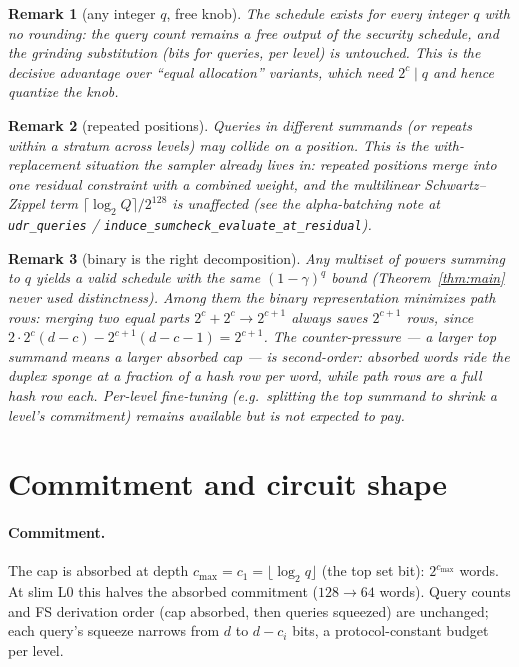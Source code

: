 \documentclass[11pt]{article}
\newcommand{\code}[1]{\texttt{#1}}
\newtheorem{remark}{Remark}
\theoremstyle{definition}
\begin{document}
\begin{remark}[any integer $q$, free knob]
The schedule exists for every integer $q$ with no rounding: the query
count remains a free output of the security schedule, and the grinding
substitution (bits for queries, per level) is untouched. This is the
decisive advantage over ``equal allocation'' variants, which need
$2^c \mid q$ and hence quantize the knob.
\end{remark}

\begin{remark}[repeated positions]
Queries in different summands (or repeats within a stratum across
levels) may collide on a position. This is the with-replacement
situation the sampler already lives in: repeated positions merge into
one residual constraint with a combined weight, and the multilinear
Schwartz--Zippel term $\lceil \log_2 Q \rceil / 2^{128}$ is unaffected
(see the alpha-batching note at \code{udr\_queries} /
\code{induce\_sumcheck\_evaluate\_at\_residual}).
\end{remark}

\begin{remark}[binary is the right decomposition]
Any multiset of powers summing to $q$ yields a valid schedule with the
same $(1-\gamma)^q$ bound (Theorem~\ref{thm:main} never used
distinctness). Among them the binary representation minimizes path
rows: merging two equal parts $2^c + 2^c \to 2^{c+1}$ always saves
$2^{c+1}$ rows, since $2 \cdot 2^{c}(d-c) - 2^{c+1}(d-c-1) =
2^{c+1}$. The counter-pressure --- a larger top summand means a larger
absorbed cap --- is second-order: absorbed words ride the duplex
sponge at a fraction of a hash row per word, while path rows are a
full hash row each. Per-level fine-tuning (e.g.\ splitting the top
summand to shrink a level's commitment) remains available but is not
expected to pay.
\end{remark}

\section{Commitment and circuit shape}

\paragraph{Commitment.}
The cap is absorbed at depth $c_{\max} = c_1 = \lfloor \log_2 q
\rfloor$ (the top set bit): $2^{c_{\max}}$ words. At slim L0 this
halves the absorbed commitment ($128 \to 64$ words). Query counts and
FS derivation order (cap absorbed, then queries squeezed) are
unchanged; each query's squeeze narrows from $d$ to $d - c_i$ bits,
a protocol-constant budget per level.
\end{document}

